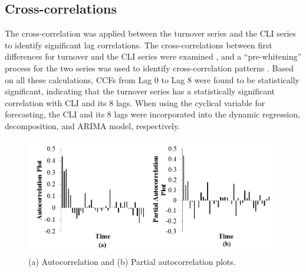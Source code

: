 \subsection{Cross-correlations}
The cross-correlation was applied between the turnover series and the CLI series to identify significant lag correlations. The cross-correlations between first differences  for turnover and the CLI series were examined \citep{de1998}, and a “pre-whitening” process for the two series was used to identify cross-correlation patterns \citep{box1970, bowie1981}.
Based on all these calculations, CCFs from Lag 0 to Lag 8 were found to be statistically significant, indicating that the turnover series has a statistically significant correlation with CLI and its 8 lags.  When using the cyclical variable for forecasting, the CLI and its 8 lags were incorporated into the dynamic regression, decomposition, and ARIMA model, respectively.  
\begin{figure}
	\centering
	\includegraphics[width=5.5in]{Fig3.jpg}
	\caption{(a) Autocorrelation and (b) Partial autocorrelation plots.}
	\label{fig:3}
\end{figure}


